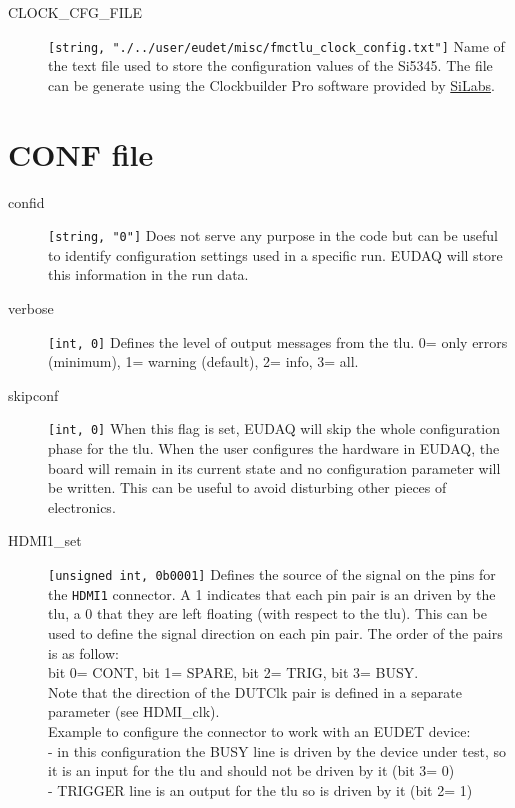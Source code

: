 \begin{description}
  \item[CLOCK\_CFG\_FILE] \verb|[string, "./../user/eudet/misc/fmctlu_clock_config.txt"]| Name of the text file used to store the configuration values of the Si5345. The file can be generate using the Clockbuilder Pro software provided by \href{https://www.silabs.com/products/development-tools/software/clock}{SiLabs}.
\end{description}

\section{CONF file}
\begin{description}
  \item[confid] \verb|[string, "0"]| Does not serve any purpose in the code but can be useful to identify configuration settings used in a specific run. EUDAQ will store this information in the run data.
  \item[verbose] \verb|[int, 0]| Defines the level of output messages from the \gls{tlu}. 0= only errors (minimum), 1= warning (default), 2= info, 3= all.
  \item[skipconf] \verb|[int, 0]| When this flag is set, EUDAQ will skip the whole configuration phase for the \gls{tlu}. When the user configures the hardware in EUDAQ, the board will remain in its current state and no configuration parameter will be written. This can be useful to avoid disturbing other pieces of electronics.
  \item[HDMI1\_set] \verb|[unsigned int, 0b0001]| Defines the source of the signal on the pins for the \verb|HDMI1| connector. A 1 indicates that each pin pair is an driven by the \gls{tlu}, a 0 that they are left floating (with respect to the \gls{tlu}). This can be used to define the signal direction on each pin pair. The order of the pairs is as follow:\\
  bit 0= CONT, bit 1= SPARE, bit 2= TRIG, bit 3= BUSY.\\
  Note that the direction of the DUTClk pair is defined in a separate parameter (see HDMI\_clk).\\
  Example to configure the connector to work with an EUDET device:\\
  - in this configuration the BUSY line is driven by the device under test, so it is an input for the \gls{tlu} and should not be driven by it (bit 3= 0)\\
  - TRIGGER line is an output for the \gls{tlu} so is driven by it (bit 2= 1)\\

\end{description}
